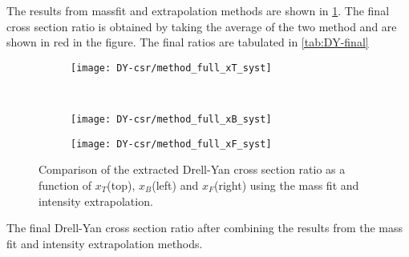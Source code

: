 \documentclass[../main.tex]{subfiles}
\begin{document}
The results from massfit and extrapolation methods are shown in \cref{fig:CSR_method}. The final cross section ratio
is obtained by taking the average of the two method and are shown in red in the figure. The final ratios are tabulated
in \cref{tab:DY-final} 
\begin{figure}[h!]
	\centering
	\begin{subfigure}{0.6\linewidth}
		\texttt{[image: DY-csr/method\_full\_xT\_syst]}
	\end{subfigure}\\
	\begin{subfigure}{0.45\linewidth}
		\texttt{[image: DY-csr/method\_full\_xB\_syst]}
	\end{subfigure}
	\begin{subfigure}{0.45\linewidth}
		\texttt{[image: DY-csr/method\_full\_xF\_syst]}
	\end{subfigure}
	\caption{Comparison of the extracted Drell-Yan cross section ratio as a function of $x_T$(top),
		$x_B$(left) and $x_F$(right) using the mass fit and intensity extrapolation.}
	\label{fig:CSR_method}
\end{figure}

\begin{table}[h!]
	\centering
	\caption{The final Drell-Yan cross section ratio after combining the results from the mass fit and intensity extrapolation methods.}
	\label{tab:DY-final}
	\scalebox{0.925}{
		
	}
\end{table}

\FloatBarrier

\ifSubfilesClassLoaded{ \printbibliography[heading=bibintoc,title={References}]}{}
\end{document}
